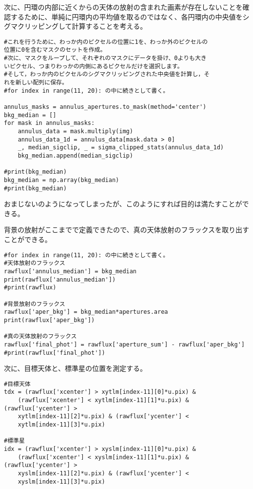 次に、円環の内部に近くからの天体の放射の含まれた画素が存在しないことを確認するために、単純に円環内の平均値を取るのではなく、各円環内の中央値をシグマクリッピングして計算することを考える。
\begin{screen}
\begin{verbatim}
#これを行うために、わっか内のピクセルの位置に1を、わっか外のピクセルの
位置に0を含むマスクのセットを作成。
#次に、マスクをループして、それぞれのマスクにデータを掛け、0よりも大き
いピクセル、つまりわっかの内側にあるピクセルだけを選択します。
#そして，わっか内のピクセルのシグマクリッピングされた中央値を計算し，そ
れを新しい配列に保存。
#for index in range(11, 20): の中に続きとして書く。

annulus_masks = annulus_apertures.to_mask(method='center')
bkg_median = []
for mask in annulus_masks:
    annulus_data = mask.multiply(img)
    annulus_data_1d = annulus_data[mask.data > 0]
    _, median_sigclip, _ = sigma_clipped_stats(annulus_data_1d)
    bkg_median.append(median_sigclip)

#print(bkg_median)
bkg_median = np.array(bkg_median)
#print(bkg_median)\end{verbatim}
\end{screen}

おまじないのようになってしまったが、このようにすれば目的は満たすことができる。

背景の放射がここまでで定義できたので、真の天体放射のフラックスを取り出すことができる。
\begin{screen}
\begin{verbatim}
#for index in range(11, 20): の中に続きとして書く。
#天体放射のフラックス
rawflux['annulus_median'] = bkg_median
print(rawflux['annulus_median'])
#print(rawflux)

#背景放射のフラックス
rawflux['aper_bkg'] = bkg_median*apertures.area
print(rawflux['aper_bkg'])

#真の天体放射のフラックス
rawflux['final_phot'] = rawflux['aperture_sum'] - rawflux['aper_bkg']
#print(rawflux['final_phot'])\end{verbatim}
\end{screen}


次に、目標天体と、標準星の位置を測定する。
\begin{screen}
\small{
\begin{verbatim}
#目標天体
tdx = (rawflux['xcenter'] > xytlm[index-11][0]*u.pix) &
    (rawflux['xcenter'] < xytlm[index-11][1]*u.pix) & (rawflux['ycenter'] >
    xytlm[index-11][2]*u.pix) & (rawflux['ycenter'] <
    xytlm[index-11][3]*u.pix)

#標準星
idx = (rawflux['xcenter'] > xyslm[index-11][0]*u.pix) &
    (rawflux['xcenter'] < xyslm[index-11][1]*u.pix) & (rawflux['ycenter'] >
    xyslm[index-11][2]*u.pix) & (rawflux['ycenter'] <
    xyslm[index-11][3]*u.pix)\end{verbatim}
}
\end{screen}

